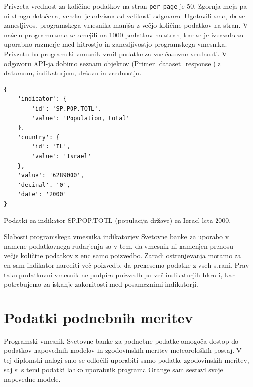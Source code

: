
Privzeta vrednost za količino podatkov na stran \verb|per_page| je 50. 
Zgornja meja pa ni strogo določena, vendar je odvisna od velikosti odgovora. 
Ugotovili smo, da se zanesljivost programskega vmesnika manjša z večjo 
količino podatkov na stran. V našem programu smo se omejili na 1000 podatkov
na stran, kar se je izkazalo za uporabno razmerje med hitrostjo in 
zanesljivostjo programskega vmesnika. Privzeto bo programski vmesnik vrnil 
podatke za vse časovne vrednosti. V odgovoru API-ja dobimo seznam objektov 
(Primer \ref{dataset_response}) z datumom, indikatorjem, državo in vrednostjo.

\begin{snippet}
\begin{center}
\begin{lstlisting}
{
    'indicator': {
        'id': 'SP.POP.TOTL',
        'value': 'Population, total'
    },
    'country': {
        'id': 'IL',
        'value': 'Israel'
    },
    'value': '6289000',
    'decimal': '0',
    'date': '2000'
}
\end{lstlisting}
\end{center}
\caption{Podatki za indikator SP.POP.TOTL (populacija države) za Izrael leta
2000.}
\label{dataset_response}
\end{snippet} 

Slabosti programskega vmesnika indikatorjev Svetovne banke za uporabo v namene
podatkovnega rudarjenja so v tem, da vmesnik ni namenjen prenosu večje 
količine podatkov z eno samo poizvedbo. Zaradi ostranjevanja moramo za en sam 
indikator narediti več poizvedb, da prenesemo podatke z vseh strani. Prav 
tako podatkovni vmesnik ne podpira poizvedb po več indikatorjih hkrati, kar
potrebujemo za iskanje zakonitosti med posameznimi indikatorji.

\section{Podatki podnebnih meritev}

Programski vmesnik Svetovne banke za podnebne podatke omogoča dostop do 
podatkov napovednih modelov in zgodovinskih meritev meteoroloških postaj. V tej 
diplomski nalogi smo se odločili uporabiti samo podatke zgodovinskih meritev, 
saj si s temi podatki lahko uporabnik programa Orange sam sestavi svoje 
napovedne modele.

